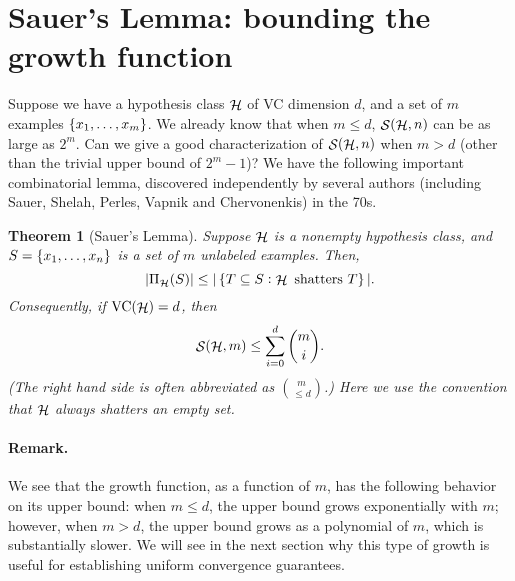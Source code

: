 \documentclass{article}
\newtheorem{theorem}{Theorem}
\DeclareMathOperator*{\Hcal}{{\cal H}}
\DeclareMathOperator*{\Scal}{{\cal S}}
\DeclareMathOperator*{\VC}{{\rm VC}}
\begin{document}
\section{Sauer's Lemma: bounding the growth function}
Suppose we have a hypothesis class $\Hcal$ of VC dimension $d$, and a set of $m$
examples $\cbr{x_1, \ldots, x_m}$. We already know that when $m \leq d$,
$\Scal(\Hcal, n)$ can be as large as $2^m$. Can we give a good characterization of $\Scal(\Hcal, n)$ when $m > d$ (other than the trivial upper bound of $2^m-1$)? We have the following important combinatorial lemma, discovered independently by several authors (including Sauer, Shelah, Perles, Vapnik and Chervonenkis) in the 70s.

\begin{theorem}[Sauer's Lemma]
Suppose $\Hcal$ is a nonempty hypothesis class, and $S = \cbr{x_1,\ldots,x_n}$ is a set of $m$ unlabeled examples. Then,
\[ |\Pi_{\Hcal}(S)| \leq |\cbr{T \subseteq S: \Hcal \text{ shatters } T}|. \]
Consequently, if $\VC(\Hcal) = d$, then
\[ \Scal(\Hcal, m) \leq \sum_{i=0}^d {m \choose i}. \]
(The right hand side is often abbreviated as $m \choose \leq d$.) Here we use the convention that $\Hcal$ always shatters an empty set.
\end{theorem}

\paragraph{Remark.} We see that the growth function, as a function of $m$, has the following behavior on its upper bound: when $m \leq d$, the upper bound grows exponentially with $m$; however, when $m > d$, the upper bound grows as a polynomial of $m$, which is substantially slower. We will see in the next section why this type of growth is useful for establishing uniform convergence guarantees.
\end{document}
